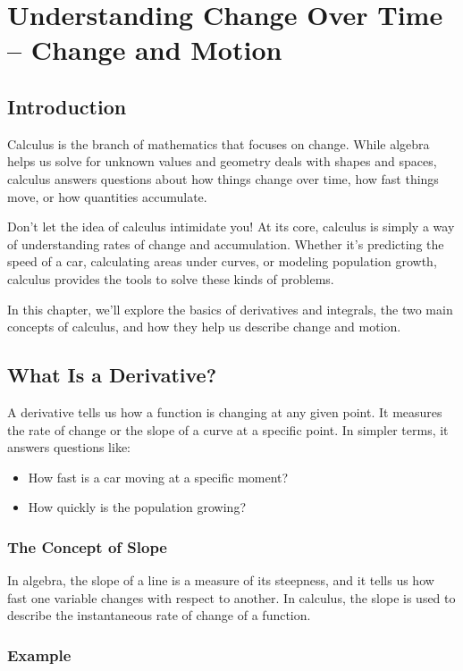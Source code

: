 \chapter{Understanding Change Over Time – Change and Motion}

\section{Introduction}
Calculus is the branch of mathematics that focuses on change. While algebra helps us solve for unknown values and geometry deals with shapes and spaces, calculus answers questions about how things change over time, how fast things move, or how quantities accumulate.

Don’t let the idea of calculus intimidate you! At its core, calculus is simply a way of understanding rates of change and accumulation. Whether it’s predicting the speed of a car, calculating areas under curves, or modeling population growth, calculus provides the tools to solve these kinds of problems.

In this chapter, we’ll explore the basics of derivatives and integrals, the two main concepts of calculus, and how they help us describe change and motion.

\section{What Is a Derivative?}
A derivative tells us how a function is changing at any given point. It measures the rate of change or the slope of a curve at a specific point. In simpler terms, it answers questions like:
\begin{itemize}
    \item How fast is a car moving at a specific moment?
    \item How quickly is the population growing?
\end{itemize}

\subsection{The Concept of Slope}
In algebra, the slope of a line is a measure of its steepness, and it tells us how fast one variable changes with respect to another. In calculus, the slope is used to describe the instantaneous rate of change of a function.

\subsection{Example}

